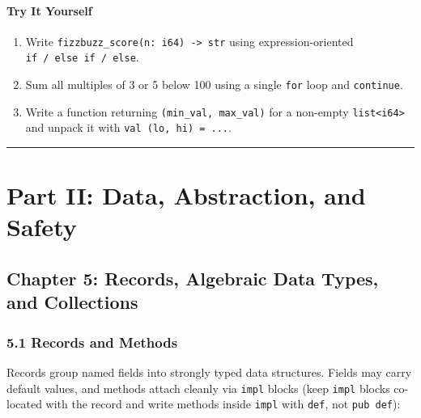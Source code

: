 \documentclass[
  english,
  oneside]{book}
\providecommand{\tightlist}{%
  \setlength{\itemsep}{0pt}\setlength{\parskip}{0pt}}
\begin{document}
\subsection{Try It Yourself}\label{try-it-yourself-3}

\begin{enumerate}
\def\labelenumi{\arabic{enumi}.}
\tightlist
\item
  Write \texttt{fizzbuzz\_score(n:\ i64)\ -\textgreater{}\ str} using
  expression-oriented \texttt{if\ /\ else\ if\ /\ else}.
\item
  Sum all multiples of 3 or 5 below 100 using a single \texttt{for} loop
  and \texttt{continue}.
\item
  Write a function returning \texttt{(min\_val,\ max\_val)} for a
  non-empty \texttt{list\textless{}i64\textgreater{}} and unpack it with
  \texttt{val\ (lo,\ hi)\ =\ ...}.
\end{enumerate}

\begin{center}\rule{0.5\linewidth}{0.5pt}\end{center}

\part{Part II: Data, Abstraction, and
Safety}\label{part-ii-data-abstraction-and-safety}

\chapter{Chapter 5: Records, Algebraic Data Types, and
Collections}\label{chapter-5-records-algebraic-data-types-and-collections}

\section{5.1 Records and Methods}\label{records-and-methods}

Records group named fields into strongly typed data structures. Fields
may carry default values, and methods attach cleanly via \texttt{impl}
blocks (keep \texttt{impl} blocks co-located with the record and write
methods inside \texttt{impl} with \texttt{def}, not \texttt{pub\ def}):
\end{document}
